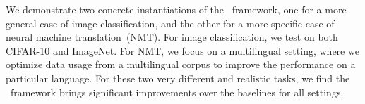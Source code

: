 We demonstrate two concrete instantiations of the \dds~framework, one for a more general case of image classification, and the other for a more specific case of neural machine translation~(NMT). For image classification, we test on both CIFAR-10 and ImageNet. For NMT, we focus on a multilingual setting, where we optimize data usage from a multilingual corpus to improve the performance on a particular language. %
For these two very different and realistic tasks, we find the \dds~framework brings significant improvements over the baselines for all settings.
